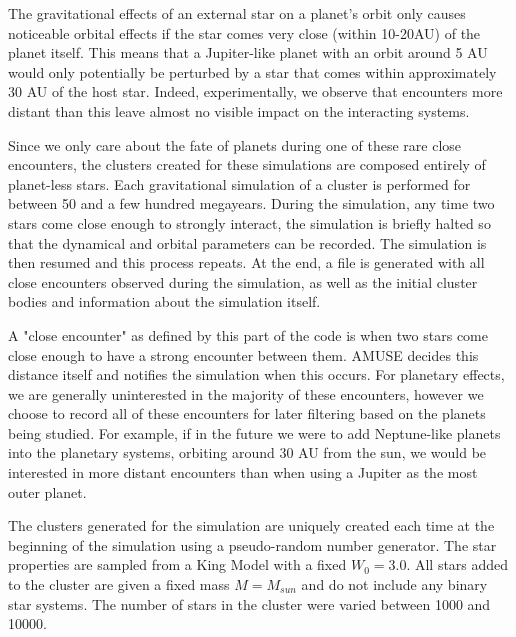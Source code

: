\documentclass[12pt]{article}
\begin{document}
    The gravitational effects of an external star on a planet's orbit only
    causes noticeable orbital effects if the star comes very close (within 10-20AU)
    of the planet itself. This means that a Jupiter-like planet with an orbit around
    5 AU would only potentially be perturbed by a star that comes within 
    approximately 30 AU of the host star. Indeed, experimentally, we observe that
    encounters more distant than this leave almost no visible impact on the
    interacting systems. 

    Since we only care about the fate of planets during one of these 
    rare close encounters,
    the clusters created for these simulations are composed entirely of planet-less stars.
    Each gravitational simulation of a cluster is performed for between 50 
    and a few hundred megayears. During the simulation, any time two stars
    come close enough to strongly interact, the simulation is briefly halted so that
    the dynamical and orbital parameters can be recorded. The simulation is then
    resumed and this process repeats. At the end, a file is generated with
    all close encounters observed during the simulation, as well as the initial
    cluster bodies and information about the simulation itself.

    A "close encounter" as defined by this part of the code is when two stars
    come close enough to have a strong encounter between them. AMUSE decides
    this distance itself and notifies the simulation when this occurs. For planetary
    effects, we are generally uninterested in the majority of these encounters, however
    we choose to record all of these encounters for later filtering based on the
    planets being studied. For example, if in the future we were to add Neptune-like
    planets into the planetary systems, orbiting around 30 AU from the sun, we would
    be interested in more distant encounters than when using a Jupiter as the most
    outer planet.

    The clusters generated for the simulation are uniquely created each time at the
    beginning of the simulation using a pseudo-random number generator. 
    The star properties are sampled from a
    King Model with a fixed $W_0=3.0$. %
    All stars added to the cluster are given a fixed mass $M=M_{sun}$ and do not
    include any binary star systems. The number
    of stars in the cluster were varied between 1000 and 10000. 
\end{document}
